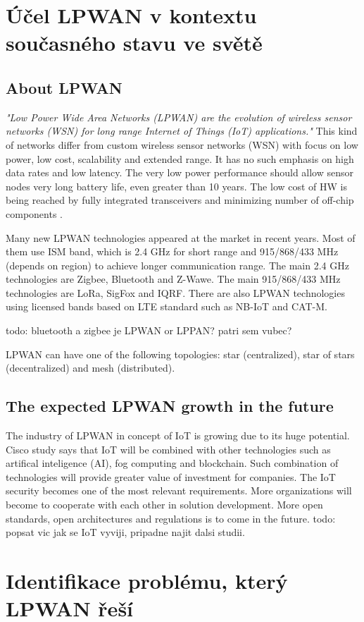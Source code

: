 \chapter{Účel LPWAN v kontextu současného stavu ve světě}

\section{About LPWAN}
\textit{"Low Power Wide Area Networks (LPWAN) are the
evolution of wireless sensor networks (WSN) for long
range Internet of Things (IoT) applications."} \cite{MURS Band for LPWAN Applications}
This kind of networks differ from custom wireless sensor networks (WSN) with focus on low power, low cost, scalability and extended range.
It has no such emphasis on high data rates and low latency.
The very low power performance should allow sensor nodes very long battery life, even greater than 10 years.
The low cost of HW is being reached by fully integrated transceivers and minimizing number of off-chip components \cite{MURS Band for LPWAN Applications}.


Many new LPWAN technologies appeared at the market in recent years.
Most of them use ISM band, which is 2.4 GHz for short range and 915/868/433 MHz (depends on region) to achieve longer communication range.
The main 2.4 GHz technologies are Zigbee, Bluetooth and Z-Wawe.
The main 915/868/433 MHz technologies are LoRa, SigFox and IQRF.
There are also LPWAN technologies using licensed bands based on LTE standard
such as NB-IoT and CAT-M.

todo: bluetooth a zigbee je LPWAN or LPPAN? patri sem vubec?







LPWAN can have one of the following topologies: star (centralized), star of stars (decentralized) and mesh (distributed).
\cite{high density LPWAN}










\section{The expected LPWAN growth in the future}
The industry of LPWAN in concept of IoT is growing due to its huge potential.
Cisco study \cite{IoT cisco study} says that IoT will be combined with other technologies such as artifical inteligence (AI), fog computing and blockchain. Such combination of technologies will provide greater value of investment for companies. 
The IoT security becomes one of the most relevant requirements.
More organizations will become to cooperate with each other in solution development.
More open standards, open architectures and regulations is to come in the future.
todo: popsat vic jak se IoT vyviji, pripadne najit dalsi studii.
















\chapter{Identifikace problému, který LPWAN řeší}